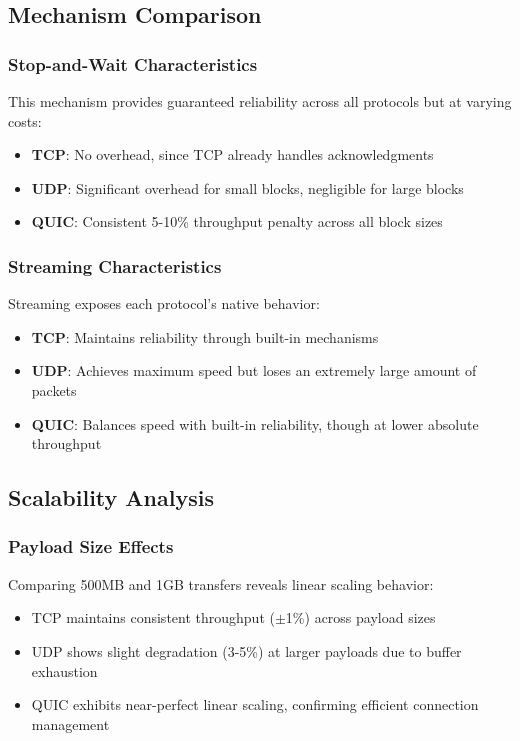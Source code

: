 \documentclass[12pt,a4paper]{article}
\begin{document}
\subsection{Mechanism Comparison}

\subsubsection{Stop-and-Wait Characteristics}
This mechanism provides guaranteed reliability across all protocols but at varying costs:
\begin{itemize}
    \item \textbf{TCP}: No overhead, since TCP already handles acknowledgments
    \item \textbf{UDP}: Significant overhead for small blocks, negligible for large blocks
    \item \textbf{QUIC}: Consistent 5-10\% throughput penalty across all block sizes
\end{itemize}

\subsubsection{Streaming Characteristics}
Streaming exposes each protocol's native behavior:
\begin{itemize}
    \item \textbf{TCP}: Maintains reliability through built-in mechanisms
    \item \textbf{UDP}: Achieves maximum speed but loses an extremely large amount of packets
    \item \textbf{QUIC}: Balances speed with built-in reliability, though at lower absolute throughput
\end{itemize}

\subsection{Scalability Analysis}

\subsubsection{Payload Size Effects}
Comparing 500MB and 1GB transfers reveals linear scaling behavior:
\begin{itemize}
    \item TCP maintains consistent throughput ($\pm$1\%) across payload sizes
    \item UDP shows slight degradation (3-5\%) at larger payloads due to buffer exhaustion
    \item QUIC exhibits near-perfect linear scaling, confirming efficient connection management
\end{itemize}
\end{document}
